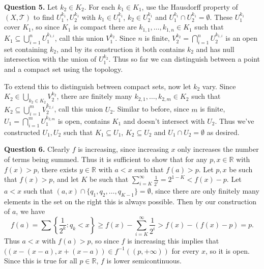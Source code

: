 \documentclass[letterpaper, reqno,11pt]{article}
\begin{document}
\newpage\phantom{blabla}
\newpage

{\medskip\noindent\bf Question 5.} Let $k_2\in K_2$. For each $k_1\in K_1$, use the Hausdorff property of $(X,\mathcal T)$ to find $U_1^{k_1},U_2^{k_1}$ with $k_1\in U_1^{k_1}$, $k_2\in U_2^{k_1}$ and $U_1^{k_1}\cap U_2^{k_1}=\emptyset$. These $U_1^{k_1}$ cover $K_1$, so since $K_1$ is compact there are $k_{1,1},\ldots,k_{1,n}\in K_1$ such that $K_1\subseteq\bigcup_{i=1}^{n}U_{1}^{k_{1,i}}$, call this union $V_1^{k_2}$. Since $n$ is finite, $V_2^{k_2}=\bigcap_{i=1}^{n}U_2^{k_{1,i}}$ is an open set containing $k_2$, and by its construction it both contains $k_2$ and has null intersection with the union of $U_1^{k_2}$. Thus so far we can distinguish between a point and a compact set using the topology.

To extend this to distinguish between compact sets, now let $k_2$ vary. Since $K_2\in \bigcup_{k_2\in K_2}V_2^{k_2}$, there are finitely many $k_{2,1},\ldots,k_{2,m}\in K_2$ such that $K_2\subseteq \bigcup_{i=1}^{m}V_2^{k_{2,i}}$, call this union $U_2$. Similar to before, since $m$ is finite, $U_1=\bigcap_{i=1}^{m}U_1^{k_{2,m}}$ is open, contains $K_1$ and doesn't intersect with $U_2$. Thus we've constructed $U_1,U_2$ such that $K_1\subseteq U_1$, $K_2\subseteq U_2$ and $U_1\cap U_2=\emptyset$ as desired.

\newpage\phantom{blabla}
\newpage

{\medskip\noindent\bf Question 6.} Clearly $f$ is increasing, since increasing $x$ only increases the number of terms being summed. Thus it is sufficient to show that for any $p,x\in \mathbb{R}$ with $f(x)>p$, there exists $y\in \mathbb{R}$ with $a<x$ such that $f(a)>p$. Let $p,x$ be such that $f(x)>p$, and let $K$ be such that $\sum_{i=K}^{\infty}\frac{1}{2^{i}}=2^{1-K}<f(x)-p$. Let $a<x$ such that $(a,x)\cap \{q_1, q_2,\ldots,q_{K-1}\}=\emptyset$, since there are only finitely many elements in the set on the right this is always possible. Then by our construction of $a$, we have
\[
    f(a)=\sum \left\{\frac{1}{2^{k}}: q_k<x\right\}\geq f(x)-\sum_{i=K}^{\infty}\frac{1}{2^{i}}>f(x)-(f(x)-p)=p
.\]
Thus $a<x$ with $f(a)>p$, so since $f$ is increasing this implies that $((x-(x-a),x+(x-a))\in f^{-1}((p,+\infty))$ for every $x$, so it is open. Since this is true for all $p\in \mathbb{R}$, $f$ is lower semicontinuous.
\end{document}
